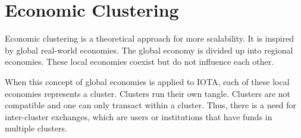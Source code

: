 \section{Economic Clustering}\label{economic-clustering}

Economic clustering is a theoretical approach for more scalability. It is inspired by global real-world economies. The global economy is divided up into regional economies. These local economies coexist but do not influence each other. 

When this concept of global economies is applied to IOTA, each of these local economies represents a cluster. Clusters run their own tangle. Clusters are not compatible and one can only transact within a cluster. Thus, there is a need for inter-cluster exchanges, which are users or institutions that have funds in multiple clusters. 
